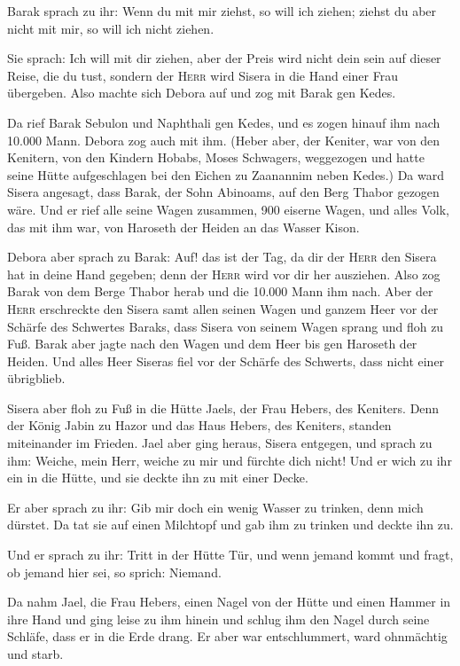  Barak sprach zu ihr: Wenn du mit mir ziehst, so will ich
ziehen; ziehst du aber nicht mit mir, so will ich nicht ziehen.

 Sie sprach: Ich will mit dir ziehen, aber der Preis wird
nicht dein sein auf dieser Reise, die du tust, sondern der \textsc{Herr}
wird Sisera in die Hand einer Frau übergeben. Also machte sich Debora
auf und zog mit Barak gen Kedes.

 Da rief Barak Sebulon und Naphthali gen Kedes, und es
zogen hinauf ihm nach 10.000 Mann. Debora zog auch mit ihm.
 (Heber aber, der Keniter, war von den Kenitern, von den
Kindern Hobabs, Moses Schwagers, weggezogen und hatte seine Hütte
aufgeschlagen bei den Eichen zu Zaanannim neben Kedes.) 
Da ward Sisera angesagt, dass Barak, der Sohn Abinoams, auf den Berg
Thabor gezogen wäre.  Und er rief alle seine Wagen
zusammen, 900 eiserne Wagen, und alles Volk, das mit ihm war, von
Haroseth der Heiden an das Wasser Kison.

 Debora aber sprach zu Barak: Auf! das ist der Tag, da
dir der \textsc{Herr} den Sisera hat in deine Hand gegeben; denn der
\textsc{Herr} wird vor dir her ausziehen. Also zog Barak von dem Berge
Thabor herab und die 10.000 Mann ihm nach.  Aber der
\textsc{Herr} erschreckte den Sisera samt allen seinen Wagen und ganzem
Heer vor der Schärfe des Schwertes Baraks, dass Sisera von seinem Wagen
sprang und floh zu Fuß.  Barak aber jagte nach den Wagen
und dem Heer bis gen Haroseth der Heiden. Und alles Heer Siseras fiel
vor der Schärfe des Schwerts, dass nicht einer übrigblieb.

 Sisera aber floh zu Fuß in die Hütte Jaels, der Frau
Hebers, des Keniters. Denn der König Jabin zu Hazor und das Haus Hebers,
des Keniters, standen miteinander im Frieden.  Jael aber
ging heraus, Sisera entgegen, und sprach zu ihm: Weiche, mein Herr,
weiche zu mir und fürchte dich nicht! Und er wich zu ihr ein in die
Hütte, und sie deckte ihn zu mit einer Decke.

 Er aber sprach zu ihr: Gib mir doch ein wenig Wasser zu
trinken, denn mich dürstet. Da tat sie auf einen Milchtopf und gab ihm
zu trinken und deckte ihn zu.

 Und er sprach zu ihr: Tritt in der Hütte Tür, und wenn
jemand kommt und fragt, ob jemand hier sei, so sprich: Niemand.

 Da nahm Jael, die Frau Hebers, einen Nagel von der Hütte
und einen Hammer in ihre Hand und ging leise zu ihm hinein und schlug
ihm den Nagel durch seine Schläfe, dass er in die Erde drang. Er aber
war entschlummert, ward ohnmächtig und starb.

